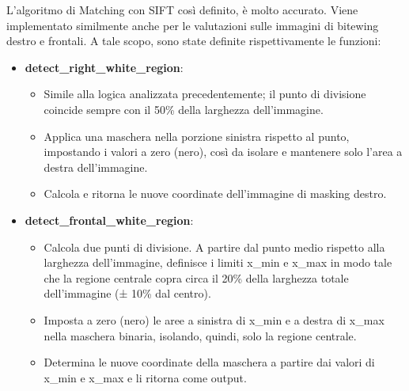 \documentclass[12pt,a4paper,openright,twoside]{book}
\begin{document}
L'algoritmo di Matching con SIFT così definito, è molto accurato. Viene implementato similmente anche per le valutazioni sulle immagini di bitewing destro e frontali. A tale scopo, sono state definite rispettivamente le funzioni:
\begin{itemize}
\item \textbf{detect\_right\_white\_region}:
\begin{itemize}
\item Simile alla logica analizzata precedentemente; il punto di divisione coincide sempre con il 50\% della larghezza dell'immagine.
\item Applica una maschera nella porzione sinistra rispetto al punto, impostando i valori a zero (nero), così da isolare e mantenere solo l'area a destra dell'immagine.
\item Calcola e ritorna le nuove coordinate dell'immagine di masking destro.
\end{itemize}

\item \textbf{detect\_frontal\_white\_region}:
\begin{itemize}
\item Calcola due punti di divisione. A partire dal punto medio rispetto alla larghezza dell'immagine, definisce i limiti x\_min e x\_max in modo tale che la regione centrale copra circa il 20\% della larghezza totale dell'immagine (± 10\% dal centro).
\item Imposta a zero (nero) le aree a sinistra di x\_min e a destra di x\_max nella maschera binaria, isolando, quindi, solo la regione centrale.
\item Determina le nuove coordinate della maschera a partire dai valori di x\_min e x\_max e li ritorna come output.
\end{itemize}
\end{itemize}


\end{document}
